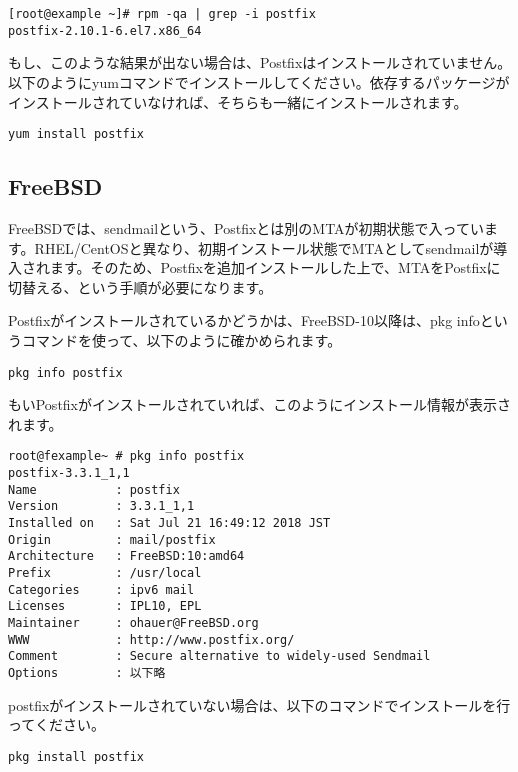 \begin{lstlisting}[basicstyle=\ttfamily\footnotesize, frame=single]
[root@example ~]# rpm -qa | grep -i postfix
postfix-2.10.1-6.el7.x86_64
\end{lstlisting}

もし、このような結果が出ない場合は、Postfixはインストールされていません。以下のようにyumコマンドでインストールしてください。依存するパッケージがインストールされていなければ、そちらも一緒にインストールされます。

\begin{lstlisting}[basicstyle=\ttfamily\footnotesize, frame=single]
yum install postfix
\end{lstlisting}

\subsection{FreeBSD}
FreeBSDでは、sendmailという、Postfixとは別のMTAが初期状態で入っています。RHEL/CentOSと異なり、初期インストール状態でMTAとしてsendmailが導入されます。そのため、Postfixを追加インストールした上で、MTAをPostfixに切替える、という手順が必要になります。

Postfixがインストールされているかどうかは、FreeBSD-10以降は、pkg infoというコマンドを使って、以下のように確かめられます。

\begin{lstlisting}[basicstyle=\ttfamily\footnotesize, frame=single]
pkg info postfix
\end{lstlisting}

もいPostfixがインストールされていれば、このようにインストール情報が表示されます。

\begin{lstlisting}[basicstyle=\ttfamily\footnotesize, frame=single]
root@fexample~ # pkg info postfix
postfix-3.3.1_1,1
Name           : postfix
Version        : 3.3.1_1,1
Installed on   : Sat Jul 21 16:49:12 2018 JST
Origin         : mail/postfix
Architecture   : FreeBSD:10:amd64
Prefix         : /usr/local
Categories     : ipv6 mail
Licenses       : IPL10, EPL
Maintainer     : ohauer@FreeBSD.org
WWW            : http://www.postfix.org/
Comment        : Secure alternative to widely-used Sendmail
Options        : 以下略
\end{lstlisting}


postfixがインストールされていない場合は、以下のコマンドでインストールを行ってください。

\begin{lstlisting}[basicstyle=\ttfamily\footnotesize, frame=single]
pkg install postfix
\end{lstlisting}

